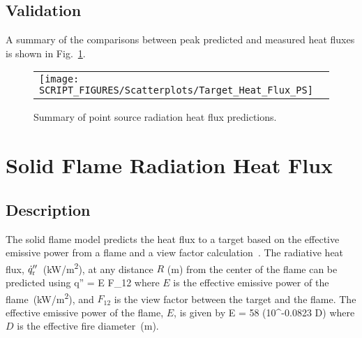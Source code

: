 

\clearpage


\subsection*{Validation}

A summary of the comparisons between peak predicted and measured heat fluxes is shown in Fig.~\ref{Heat_Flux_Point_Source_Summary}.

\begin{figure}[!ht]
\begin{center}
\begin{tabular}{l}
\texttt{[image: SCRIPT\_FIGURES/Scatterplots/Target\_Heat\_Flux\_PS]}
\end{tabular}
\end{center}
\caption[Summary of point source radiation heat flux predictions]
{Summary of point source radiation heat flux predictions.}
\label{Heat_Flux_Point_Source_Summary}
\end{figure}


\clearpage


\section{Solid Flame Radiation Heat Flux}
\label{sec:Solid_Flame_Radiation}

\subsection*{Description}

The solid flame model predicts the heat flux to a target based on the effective emissive power from a flame and a view factor calculation~\cite{Beyler2:SFPE}.
The radiative heat flux, $\dot q''\sb{r}$~(\si{kW/m^2}), at any distance $R$ (\si{m}) from the center of the flame can be predicted using
\be
\dot q'' = E F_{12}
\label{eq:solid_flame}
\ee
where $E$ is the effective emissive power of the flame~(\si{kW/m^2}), and $F_{12}$ is the view factor between the target and the flame.
The effective emissive power of the flame, $E$, is given by
\be
E = 58 (10^{-0.0823 D})
\label{eq:solid_flame_E}
\ee
where $D$ is the effective fire diameter~(\si{m}).

